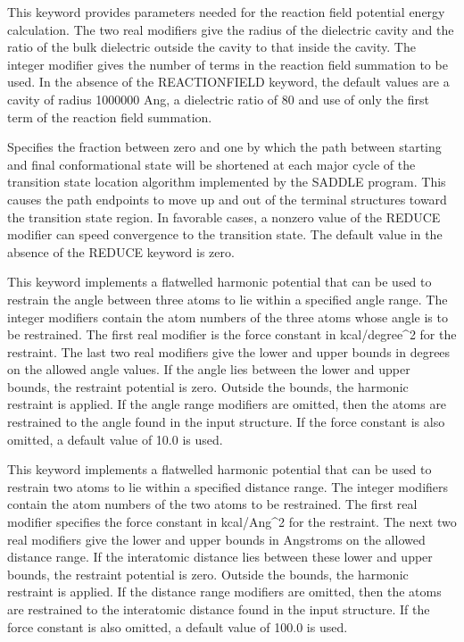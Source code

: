 \documentclass[letterpaper,11pt,english]{sphinxmanual}
\begin{document}

  This keyword provides parameters needed for the reaction field potential energy calculation. The two real modifiers give the radius of the dielectric cavity and the ratio of the bulk dielectric outside the cavity to that inside the cavity. The integer modifier gives the number of terms in the reaction field summation to be used. In the absence of the REACTIONFIELD keyword, the default values are a cavity of radius 1000000 Ang, a dielectric ratio of 80 and use of only the first term of the reaction field summation.

  Specifies the fraction between zero and one by which the path between starting and final conformational state will be shortened at each major cycle of the transition state location algorithm implemented by the SADDLE program. This causes the path endpoints to move up and out of the terminal structures toward the transition state region. In favorable cases, a nonzero value of the REDUCE modifier can speed convergence to the transition state. The default value in the absence of the REDUCE keyword is zero.

  This keyword implements a flat\sphinxhyphen{}welled harmonic potential that can be used to restrain the angle between three atoms to lie within a specified angle range. The integer modifiers contain the atom numbers of the three atoms whose angle is to be restrained.  The first real modifier is the force constant in kcal/degree\textasciicircum{}2 for the restraint. The last two real modifiers give the lower and upper bounds in degrees on the allowed angle values. If the angle lies between the lower and upper bounds, the restraint potential is zero. Outside the bounds, the harmonic restraint is applied. If the angle range modifiers are omitted, then the atoms are restrained to the angle found in the input structure. If the force constant is also omitted, a default value of 10.0 is used.

  This keyword implements a flat\sphinxhyphen{}welled harmonic potential that can be used to restrain two atoms to lie within a specified distance range. The integer modifiers contain the atom numbers of the two atoms to be restrained. The first real modifier specifies the force constant in kcal/Ang\textasciicircum{}2 for the restraint. The next two real modifiers give the lower and upper bounds in Angstroms on the allowed distance range. If the interatomic distance lies between these lower and upper bounds, the restraint potential is zero. Outside the bounds, the harmonic restraint is applied. If the distance range modifiers are omitted, then the atoms are restrained to the interatomic distance found in the input structure. If the force constant is also omitted, a default value of 100.0 is used.
\end{document}
